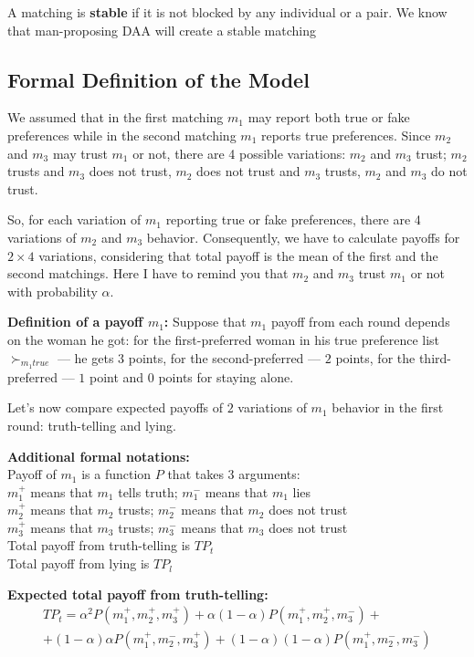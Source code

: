 \documentclass[a4paper]{article} %
\begin{document}
\hfill 
\break
A matching is \textbf{stable} if it is not blocked by any individual or a pair.
We know that man-proposing DAA will create a stable matching







\subsection{Formal Definition of the Model}
We assumed that in the first matching $m_1$ may report both true or fake preferences while in the second matching $m_1$ reports true preferences. Since $m_2$ and $m_3$ may trust $m_1$ or not, there are 4 possible variations: $m_2$ and $m_3$ trust; $m_2$ trusts and $m_3$ does not trust, $m_2$ does not trust and $m_3$ trusts, $m_2$ and $m_3$ do not trust.

\hfill
\break
So, for each variation of $m_1$ reporting true or fake preferences, there are 4 variations of $m_2$ and $m_3$ behavior. Consequently, we have to calculate payoffs for $2 \times 4$ variations, considering that total payoff is the mean of the first and the second matchings. Here I have to remind you that $m_2$ and $m_3$ trust $m_1$ or not with probability $\alpha$.

\hfill
\break
\textbf{Definition of a payoff $m_1$:}
Suppose that $m_1$ payoff from each round depends on the woman he got: for the first-preferred woman in his true preference list \textbf{$\succ_{m_1 true}$} — he gets $3$ points, for the second-preferred — $2$ points, for the third-preferred — $1$ point and $0$ points for staying alone.

\hfill
\break
Let's now compare expected payoffs of $2$ variations of $m_1$ behavior in the first round: truth-telling and lying.


\hfill
\break
\textbf{Additional formal notations:}\\
Payoff of $m_1$ is a function $P$ that takes 3 arguments:\\
$m_1^+$ means that $m_1$ tells truth; $m_1^-$ means that $m_1$ lies\\
$m_2^+$ means that $m_2$ trusts; $m_2^-$ means that $m_2$ does not trust\\
$m_3^+$ means that $m_3$ trusts; $m_3^-$ means that $m_3$ does not trust\\
Total payoff from truth-telling is $TP_t$\\
Total payoff from lying is $TP_l$

\hfill
\break
\textbf{Expected total payoff from truth-telling:}
\begin{align}
   TP_t = \alpha ^ 2P(m_1^+,m_2^+,m_3^+) + \alpha(1-\alpha)P(m_1^+,m_2^+,m_3^-) + \\  +(1-\alpha)\alpha P(m_1^+,m_2^-,m_3^+) + (1-\alpha)(1-\alpha) P(m_1^+,m_2^-,m_3^-) 
\end{align}
\end{document}
